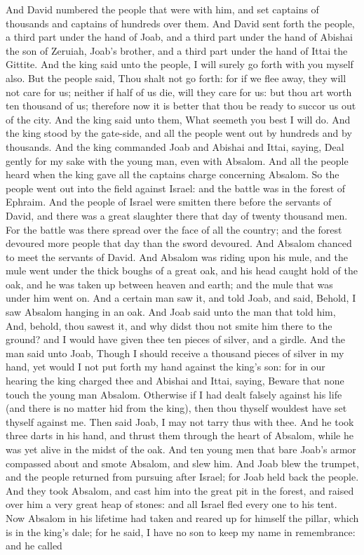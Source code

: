 And David numbered the people that were with him, and set captains of thousands and captains of hundreds over them. And David sent forth the people, a third part under the hand of Joab, and a third part under the hand of Abishai the son of Zeruiah, Joab’s brother, and a third part under the hand of Ittai the Gittite. And the king said unto the people, I will surely go forth with you myself also. But the people said, Thou shalt not go forth: for if we flee away, they will not care for us; neither if half of us die, will they care for us: but thou art worth ten thousand of us; therefore now it is better that thou be ready to succor us out of the city. And the king said unto them, What seemeth you best I will do. And the king stood by the gate-side, and all the people went out by hundreds and by thousands. And the king commanded Joab and Abishai and Ittai, saying, Deal gently for my sake with the young man, even with Absalom. And all the people heard when the king gave all the captains charge concerning Absalom.  So the people went out into the field against Israel: and the battle was in the forest of Ephraim. And the people of Israel were smitten there before the servants of David, and there was a great slaughter there that day of twenty thousand men. For the battle was there spread over the face of all the country; and the forest devoured more people that day than the sword devoured.  And Absalom chanced to meet the servants of David. And Absalom was riding upon his mule, and the mule went under the thick boughs of a great oak, and his head caught hold of the oak, and he was taken up between heaven and earth; and the mule that was under him went on. And a certain man saw it, and told Joab, and said, Behold, I saw Absalom hanging in an oak. And Joab said unto the man that told him, And, behold, thou sawest it, and why didst thou not smite him there to the ground? and I would have given thee ten pieces of silver, and a girdle. And the man said unto Joab, Though I should receive a thousand pieces of silver in my hand, yet would I not put forth my hand against the king’s son: for in our hearing the king charged thee and Abishai and Ittai, saying, Beware that none touch the young man Absalom. Otherwise if I had dealt falsely against his life (and there is no matter hid from the king), then thou thyself wouldest have set thyself against me. Then said Joab, I may not tarry thus with thee. And he took three darts in his hand, and thrust them through the heart of Absalom, while he was yet alive in the midst of the oak. And ten young men that bare Joab’s armor compassed about and smote Absalom, and slew him.  And Joab blew the trumpet, and the people returned from pursuing after Israel; for Joab held back the people. And they took Absalom, and cast him into the great pit in the forest, and raised over him a very great heap of stones: and all Israel fled every one to his tent. Now Absalom in his lifetime had taken and reared up for himself the pillar, which is in the king’s dale; for he said, I have no son to keep my name in remembrance: and he called 